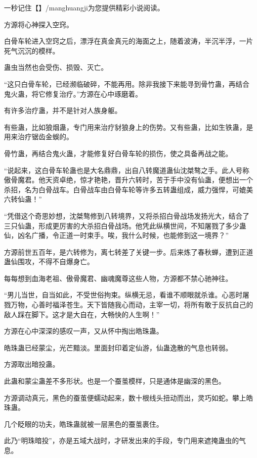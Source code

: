 
\begin{this_body}

一秒记住【】/manghuangji为您提供精彩小说阅读。

方源将心神探入空窍。

白骨车轮进入空窍之后，漂浮在真金真元的海面之上，随着波涛，半沉半浮，一片死气沉沉的模样。

蛊虫当然也会受伤、损毁、灭亡。

“这只白骨车轮，已经濒临破碎，不能再用。除非我接下来能寻到骨竹蛊，再结合鬼火蛊，将它修复治疗。”方源在心中琢磨着。

有许多治疗蛊，并不是针对人族身躯。

有些蛊，比如狼烟蛊，专门用来治疗豺狼身上的伤势。又有些蛊，比如生铁蛊，是用来治疗锯齿金蜈的。

骨竹蛊，再结合鬼火蛊，才能修复好白骨车轮的损伤，使之具备再战之能。

“说起来，这白骨车轮蛊也是大名鼎鼎，出自八转魔道蛊仙沈桀骜之手。此人号称傲骨魔君。他天资卓绝，惊才艳艳，晋升六转时，苦于手中没有仙蛊，便想出一个杀招，名为白骨战车。白骨战车由白骨车轮等许多五转蛊组成，威力强悍，可媲美六转仙蛊！”

“凭借这个奇思妙想，沈桀骜修到八转境界，又将杀招白骨战场发扬光大，结合了三只仙蛊，形成更厉害的大杀招白骨战场。他凭此纵横世间，不知屠戮了多少蛊仙，凶名广播，令正道一时束手。唉，我什么时候，也能修到这一境界？”

方源前世五百年，是六转修为，离七转差了关键一步。后来炼了春秋蝉，遭到正道蛊仙围攻，不得不自爆身亡。

每每想到血海老祖、傲骨魔君、幽魂魔尊这些人物，方源都不禁心驰神往。

“男儿当世，自当如此，不受世俗拘束。纵横无忌，看谁不顺眼就杀谁。心恶时屠戮万物，心善时福泽苍生。天下皆随我心而动，主宰一切，将所有敢于反抗自己的敌人踩在脚下。这才是大自在，大畅快的人生啊！”

方源在心中深深的感叹一声，又从怀中掏出皓珠蛊。

皓珠蛊已经蒙尘，光芒黯淡。里面封印着定仙游，仙蛊逸散的气息也转弱。

方源取出暗投蛊。

此蛊和蒙尘蛊差不多形状。也是一个蚕茧模样，只是通体是幽深的黑色。

方源调动真元，黑色的蚕茧便蠕动起来，数十根线头扭动而出，灵巧如蛇。攀上皓珠蛊。

几个眨眼的功夫，皓珠蛊就被一层黑色的蚕茧裹住。

此乃“明珠暗投”，亦是五域大战时，才研发出来的手段，专门用来遮掩蛊虫的气息。


\end{this_body}
